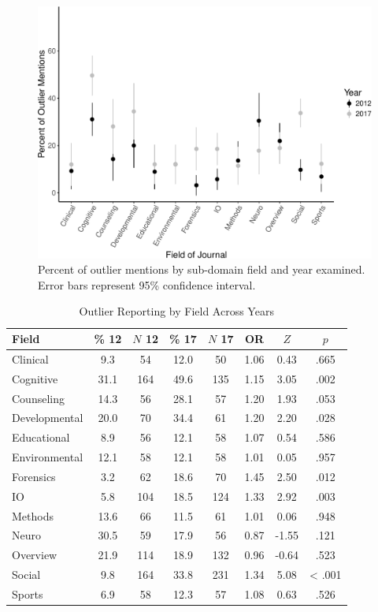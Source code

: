 \documentclass[english,man]{apa6}
\theoremstyle{definition}
\theoremstyle{definition}
\theoremstyle{definition}
\theoremstyle{remark}
\begin{document}
\begin{figure}
\centering
\includegraphics{outliers_manuscript_files/figure-latex/type-graph-1.pdf}
\caption{\label{fig:type-graph}Percent of outlier mentions by sub-domain
field and year examined. Error bars represent 95\% confidence interval.}
\end{figure}

\begin{table}[tbp]
\begin{center}
\begin{threeparttable}
\caption{\label{tab:info-table}Outlier Reporting by Field Across Years}
\begin{tabular}{lccccccc}
\toprule
Field & \% 12 & $N$ 12 & \% 17 & $N$ 17 & OR & $Z$ & $p$\\
\midrule
Clinical & 9.3 & 54 & 12.0 & 50 & 1.06 & 0.43 & .665\\
Cognitive & 31.1 & 164 & 49.6 & 135 & 1.15 & 3.05 & .002\\
Counseling & 14.3 & 56 & 28.1 & 57 & 1.20 & 1.93 & .053\\
Developmental & 20.0 & 70 & 34.4 & 61 & 1.20 & 2.20 & .028\\
Educational & 8.9 & 56 & 12.1 & 58 & 1.07 & 0.54 & .586\\
Environmental & 12.1 & 58 & 12.1 & 58 & 1.01 & 0.05 & .957\\
Forensics & 3.2 & 62 & 18.6 & 70 & 1.45 & 2.50 & .012\\
IO & 5.8 & 104 & 18.5 & 124 & 1.33 & 2.92 & .003\\
Methods & 13.6 & 66 & 11.5 & 61 & 1.01 & 0.06 & .948\\
Neuro & 30.5 & 59 & 17.9 & 56 & 0.87 & -1.55 & .121\\
Overview & 21.9 & 114 & 18.9 & 132 & 0.96 & -0.64 & .523\\
Social & 9.8 & 164 & 33.8 & 231 & 1.34 & 5.08 & < .001\\
Sports & 6.9 & 58 & 12.3 & 57 & 1.08 & 0.63 & .526\\
\bottomrule
\end{tabular}
\end{threeparttable}
\end{center}
\end{table}
\end{document}
